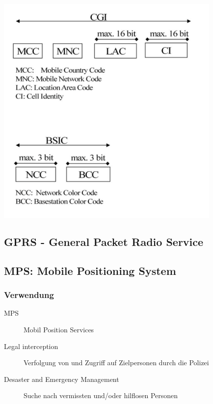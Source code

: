 \begin{minipage}{0.4 \linewidth}
\includegraphics[width =  \linewidth]{./Pics/GSMCGIundBSIC} 
\end{minipage}

\subsection{GPRS - General Packet Radio Service}



\subsection{MPS: Mobile Positioning System}

\subsubsection{Verwendung}
\begin{description}
\item [MPS] Mobil Position Services
\item [Legal interception] Verfolgung von und Zugriff auf Zielpersonen durch die Polizei
\item [Desaster and Emergency Management] Suche nach vermissten und/oder hilflosen Personen
\end{description}
\vspace{0.5cm}

